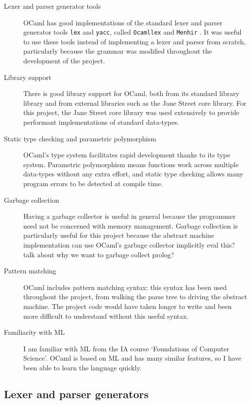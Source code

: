 \documentclass[12pt,a4paper]{report}
\begin{document}
\begin{description}
\item[Lexer and parser generator tools]
OCaml has good implementations of the standard lexer and parser generator tools \texttt{lex} and \texttt{yacc}, called \texttt{Ocamllex} \cite{ocamlyacc} and \texttt{Menhir} \cite{ocamlBook}. It was useful to use these tools instead of implementing a lexer and parser from scratch, particularly because the grammar was modified throughout the development of the project.

\item[Library support]
There is good library support for OCaml, both from its standard library library and from external libraries such as the Jane Street core library. For this project, the Jane Street core library was used extensively to provide performant implementations of standard data-types.


\item[Static type checking and parametric polymorphism]
OCaml's type system facilitates rapid development thanks to its type system. Parametric polymorphism means functions work across multiple data-types without any extra effort, and static type checking allows many program errors to be detected at compile time.


\item[Garbage collection]
Having a garbage collector is useful in general because the programmer need not be concerned with memory management. Garbage collection is particularly useful for this project because the abstract machine implementation can use OCaml's garbage collector implicitly {\color{red} eval this? talk about why we want to garbage collect prolog?}


\item[Pattern matching]
OCaml includes pattern matching syntax: this syntax has been used throughout the project, from walking the parse tree to driving the abstract machine. The project code would have taken longer to write and been more difficult to understand without this useful syntax.

\item[Familiarity with ML]
I am familiar with ML from the IA course `Foundations of Computer Science'. OCaml is based on ML and has many similar features, so I have been able to learn the language quickly.

\end{description}

\subsection{Lexer and parser generators}
\end{document}
